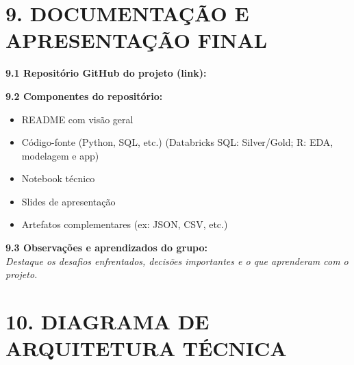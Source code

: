 \documentclass[11pt, a4paper]{article}
\newcommand{\cboxx}{$\boxtimes$} %
\newcommand{\cbox}{\leavevmode\vbox{\hrule\hbox{\vrule height 1.6ex \kern 1.6ex \vrule}\hrule}}
\begin{document}
\vspace{6pt}
\section*{9. DOCUMENTAÇÃO E APRESENTAÇÃO FINAL}

\textbf{9.1 Repositório GitHub do projeto (link):}

\vspace{12pt}
\hrulefill

\vspace{6pt}
\textbf{9.2 Componentes do repositório:}
\begin{itemize}
    \item[\cbox] README com visão geral
    \item[\cboxx] Código-fonte (Python, SQL, etc.) {\small (Databricks SQL: Silver/Gold; R: EDA, modelagem e app)}
    \item[\cboxx] Notebook técnico
    \item[\cbox] Slides de apresentação
    \item[\cbox] Artefatos complementares (ex: JSON, CSV, etc.)
\end{itemize}

\textbf{9.3 Observações e aprendizados do grupo:}\\
{\small \textit{Destaque os desafios enfrentados, decisões importantes e o que aprenderam com o projeto.}}

\vspace{18pt}
\hrulefill

\vspace{14pt}
\hrulefill

\vspace{14pt}
\hrulefill

\clearpage
\thispagestyle{empty}

\section*{10. DIAGRAMA DE ARQUITETURA TÉCNICA}
\end{document}
